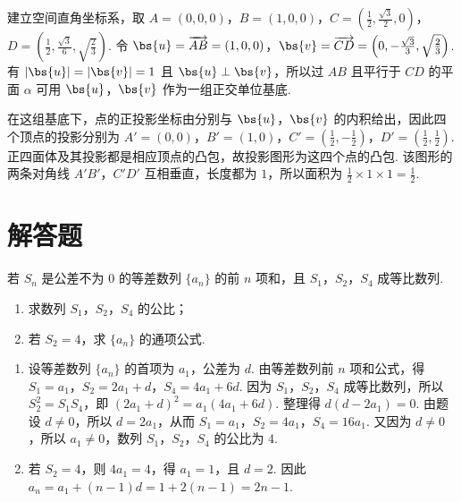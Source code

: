 \begin{solution}
建立空间直角坐标系，取 \(A=(0,0,0)\)，\(B=(1,0,0)\)，\(C=\left(\frac12,\frac{\sqrt3}{2},0\right)\)，\(D=\left(\frac12,\frac{\sqrt3}{6},\sqrt{\frac23}\right)\). 令 \(\bs{u}=\overrightarrow{AB}=(1,0,0)\)，\(\bs{v}=\overrightarrow{CD}=\left(0,-\frac{\sqrt3}{3},\sqrt{\frac23}\right)\). 有 \(\lvert\bs{u}\rvert=\lvert\bs{v}\rvert=1\) 且 \(\bs{u}\perp\bs{v}\)，所以过 \(AB\) 且平行于 \(CD\) 的平面 \(\alpha\) 可用 \(\bs{u}\)，\(\bs{v}\) 作为一组正交单位基底.

在这组基底下，点的正投影坐标由分别与 \(\bs{u}\)，\(\bs{v}\) 的内积给出，因此四个顶点的投影分别为 \(A'=(0,0)\)，\(B'=(1,0)\)，\(C'=\left(\frac12,-\frac12\right)\)，\(D'=\left(\frac12,\frac12\right)\). 正四面体及其投影都是相应顶点的凸包，故投影图形为这四个点的凸包. 该图形的两条对角线 \(A'B'\)，\(C'D'\) 互相垂直，长度都为 \(1\)，所以面积为 \(\frac12\times1\times1=\frac12\).
\end{solution}

\section{解答题}
\begin{problem}
若 \(S_{n}\) 是公差不为 \(0\) 的等差数列 \(\{a_{n}\}\) 的前 \(n\) 项和，且 \(S_{1}\)，\(S_{2}\)，\(S_{4}\) 成等比数列.

\begin{enumerate}
\item 求数列 \(S_{1}\)，\(S_{2}\)，\(S_{4}\) 的公比；
\item 若 \(S_{2} = 4\)，求 \(\{a_{n}\}\) 的通项公式.
\end{enumerate}
\end{problem}

\begin{solution}
\begin{enumerate}
\item 设等差数列 \(\{a_n\}\) 的首项为 \(a_1\)，公差为 \(d\). 由等差数列前 \(n\) 项和公式，得 \(S_1=a_1\)，\(S_2=2a_1+d\)，\(S_4=4a_1+6d\). 因为 \(S_1\)，\(S_2\)，\(S_4\) 成等比数列，所以 \(S_2^2=S_1S_4\)，即 \((2a_1+d)^2=a_1(4a_1+6d)\). 整理得 \(d(d-2a_1)=0\). 由题设 \(d\neq0\)，所以 \(d=2a_1\)，从而 \(S_1=a_1\)，\(S_2=4a_1\)，\(S_4=16a_1\). 又因为 \(d\neq0\)，所以 \(a_1\neq0\)，数列 \(S_1\)，\(S_2\)，\(S_4\) 的公比为 \(4\).

\item 若 \(S_2=4\)，则 \(4a_1=4\)，得 \(a_1=1\)，且 \(d=2\). 因此 \(a_n=a_1+(n-1)d=1+2(n-1)=2n-1\).
\end{enumerate}
\end{solution}

